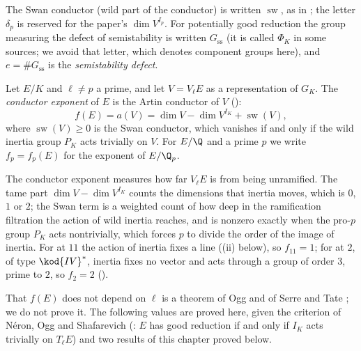 \begin{convention}\label{conv:reduction:sw}
The Swan conductor (wild part of the conductor) is written $\operatorname{sw}$, as in ; the letter
$\delta_p$ is reserved for the paper's $\dim V^{I_p}$. For potentially good reduction the group measuring the defect of
semistability is written $G_{\mathrm{ss}}$ (it is called $\Phi_K$ in some sources; we avoid that letter, which denotes
component groups here), and $e=\#G_{\mathrm{ss}}$ is the \emph{semistability defect}.
\end{convention}

\begin{definition}\label{def:reduction:conductor-exponent}
Let $E/K$ and $\ell\ne p$ a prime, and let $V=V_\ell E$ as a representation of $G_K$. The \emph{conductor exponent} of
$E$ is the Artin conductor of $V$ ():
\[
f(E)=a(V)=\dim V-\dim V^{I_K}+\operatorname{sw}(V),
\]
where $\operatorname{sw}(V)\ge0$ is the Swan conductor, which vanishes if and only if the wild inertia group $P_K$ acts
trivially on $V$. For $E/\Q$ and a prime $p$ we write $f_p=f_p(E)$ for the exponent of $E/\Q_p$.
\end{definition}

The conductor exponent measures how far $V_\ell E$ is from being unramified. The tame part $\dim V-\dim V^{I_K}$ counts
the dimensions that inertia moves, which is $0$, $1$ or $2$; the Swan term is a weighted count of how deep in the
ramification filtration the action of wild inertia reaches, and is nonzero exactly when the pro-$p$ group $P_K$ acts
nontrivially, which forces $p$ to divide the order of the image of inertia. For  at $11$ the action of inertia fixes a line ((ii)
below), so $f_{11}=1$; for  at $2$, of type $\kod{IV}^*$, inertia fixes no vector and acts through a group of order $3$, prime to $2$, so
$f_2=2$ ().

That $f(E)$ does not depend on $\ell$ is a theorem of Ogg and of Serre and Tate \cite{Ogg,SerreTate68}; we do not prove it.
The following values are proved here, given the criterion of N\'eron, Ogg and Shafarevich (: $E$ has
good reduction if and only if $I_K$ acts trivially on $T_\ell E$) and two results of this chapter proved below.

